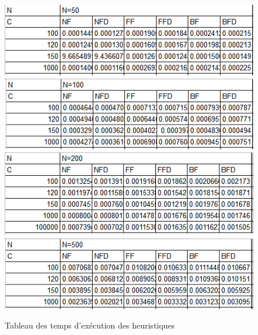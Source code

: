 \documentclass[class=article, crop=false]{standalone}
\begin{document}
\begin{figure}[H]
    \includegraphics[width=\linewidth]{../figures/tab_part1.png}
    \includegraphics[width=\linewidth]{../figures/tab_part2.png}
    \includegraphics[width=\linewidth]{../figures/tab_part3.png}
    \includegraphics[width=\linewidth]{../figures/tab_part4.png}
    \caption{Tableau des temps d'exécution des heuristiques}

\end{figure}
\end{document}
